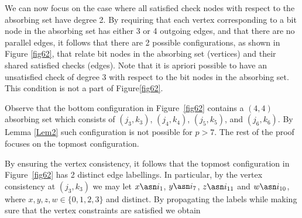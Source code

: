 We can now focus on the case where all satisfied check nodes with
respect to the absorbing set have degree 2. By requiring that each
vertex corresponding to a bit node in the absorbing set has either
3 or 4 outgoing edges, and that there are no parallel edges, it
follows that there are 2 possible configurations, as shown in
Figure \ref{fig62}, that relate bit nodes in the absorbing set
(vertices) and their shared satisfied checks (edges). Note that it
is apriori possible to have an unsatisfied check of degree 3 with
respect to the bit nodes in the absorbing set. This condition is
not a part of Figure\ref{fig62}.

Observe that the bottom configuration in Figure~\ref{fig62}
contains a $(4,4)$ absorbing set which consists of $(j_3,k_3)$,
$(j_4,k_4)$, $(j_5,k_5)$, and $(j_6,k_6)$. By Lemma \ref{Lem2}
such configuration is not possible for $p>7$. The rest of the
proof focuses on the topmost configuration.

 By ensuring the vertex consistency, it follows that the topmost
configuration in Figure~\ref{fig62} has 2 distinct edge
labellings. In particular, by the vertex consistency at
$(j_3,k_3)$ we may let $x \asn i_1$, $y \asn i_7$, $z \asn i_{11}$
and $w \asn i_{10}$, where $x,y,z,w \in \{0,1,2,3\}$ and distinct.
By propagating the labels while making sure that the vertex
constraints are satisfied we obtain


